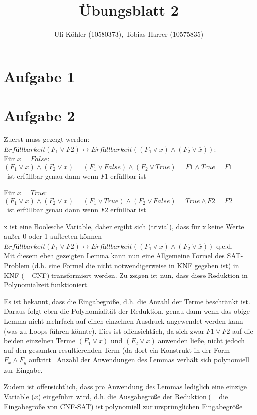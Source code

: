 \documentclass[a4paper,10pt,oneside,leqno]{scrartcl}
\title{Übungsblatt 2}
\author{Uli Köhler (10580373), Tobias Harrer (10575835)}
\begin{document}
\maketitle
\section*{Aufgabe 1}%

\section*{Aufgabe 2}%
Zuerst muss gezeigt werden: $Erfüllbarkeit(F_1\vee F2) \leftrightarrow Erfüllbarkeit((F_1\vee x) \wedge (F_2 \vee \overline{x}))$:\\
Für $x = False$: $(F_1\vee x) \wedge (F_2 \vee \overline{x}) = (F_1\vee False) \wedge (F_2 \vee True) = F1 \wedge True = F1$\\
\textrightarrow\ ist erfüllbar genau dann wenn $F1$ erfüllbar ist

Für $x = True$: $(F_1\vee x) \wedge (F_2 \vee \overline{x}) = (F_1\vee True) \wedge (F_2 \vee False) = True \wedge F2 = F2$\\
\textrightarrow\ ist erfüllbar genau dann wenn $F2$ erfüllbar ist

x ist eine Boolesche Variable, daher ergibt sich (trivial), dass für x keine Werte außer 0 oder 1 auftreten können \textrightarrow\ 
$Erfüllbarkeit(F_1\vee F2) \leftrightarrow Erfüllbarkeit((F_1\vee x) \wedge (F_2 \vee \overline{x}))$ q.e.d.\\[5mm]

Mit diesem eben gezeigten Lemma kann nun eine Allgemeine Formel des SAT-Problem (d.h. eine Formel die nicht notwendigerweise in KNF gegeben ist) in KNF (= CNF) transformiert werden. Zu zeigen ist nun, dass diese Reduktion in Polynomialzeit funktioniert.

Es ist bekannt, dass die Eingabegröße, d.h. die Anzahl der Terme beschränkt ist.
Daraus folgt eben die Polynomialität der Reduktion, genau dann wenn das obige Lemma nicht mehrfach auf einen einzelnen Ausdruck angewendet werden kann (was zu Loops führen könnte). Dies ist offensichtlich, da sich zwar $F1 \vee F2$ auf die beiden einzelnen Terme $(F_1\vee x)$ und $(F_2 \vee \overline{x})$ anwenden ließe, nicht jedoch auf den gesamten resultierenden Term (da dort ein Konstrukt in der Form $F_x \wedge F_y$ auftritt \textrightarrow\ Anzahl der Anwendungen des Lemmas verhält sich polynomiell zur Eingabe.


Zudem ist offensichtlich, dass pro Anwendung des Lemmas lediglich eine einzige Variable ($x$) eingeführt wird, d.h. die Ausgabegröße der Reduktion (= die Eingabegröße von CNF-SAT) ist polynomiell zur ursprünglichen Eingabegröße
\end{document}
